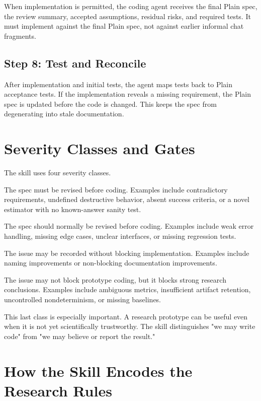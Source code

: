 \documentclass[11pt]{article}
\begin{document}
When implementation is permitted, the coding agent receives the final Plain spec,
the review summary, accepted assumptions, residual risks, and required tests. It
must implement against the final Plain spec, not against earlier informal chat
fragments.

\subsection{Step 8: Test and Reconcile}

After implementation and initial tests, the agent maps tests back to Plain
acceptance tests. If the implementation reveals a missing requirement, the Plain
spec is updated before the code is changed. This keeps the spec from degenerating
into stale documentation.

\section{Severity Classes and Gates}

The skill uses four severity classes.

\begin{description}[leftmargin=2.5cm]
\item[Critical] The spec must be revised before coding. Examples include
contradictory requirements, undefined destructive behavior, absent success
criteria, or a novel estimator with no known-answer sanity test.
\item[Major] The spec should normally be revised before coding. Examples include
weak error handling, missing edge cases, unclear interfaces, or missing regression
tests.
\item[Minor] The issue may be recorded without blocking implementation. Examples
include naming improvements or non-blocking documentation improvements.
\item[Research-risk] The issue may not block prototype coding, but it blocks
strong research conclusions. Examples include ambiguous metrics, insufficient
artifact retention, uncontrolled nondeterminism, or missing baselines.
\end{description}

This last class is especially important. A research prototype can be useful even
when it is not yet scientifically trustworthy. The skill distinguishes "we may
write code" from "we may believe or report the result."

\section{How the Skill Encodes the Research Rules}
\end{document}
